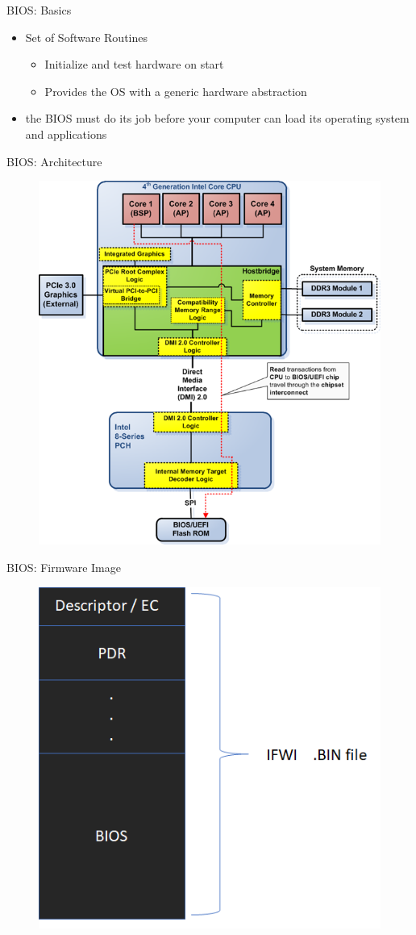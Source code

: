 \begin{frame}{BIOS: Basics}
    \begin{itemize}
        \item Set of Software Routines
            \begin{itemize}
                \item Initialize and test hardware on start
                \item Provides the OS with a generic hardware abstraction
            \end{itemize}
        \item the BIOS must do its job before your computer can load its operating system and applications
    \end{itemize}
\end{frame}

\begin{frame}{BIOS: Architecture}
    \begin{figure}
        \centering
        \includegraphics[width=0.6\linewidth]{Im/figures/bios-architecture.png}
        \label{fig:bios-architecture}
    \end{figure}
\end{frame}

\begin{frame}{BIOS: Firmware Image}
    \begin{figure}[htbp]
        \centering
        \includegraphics[width=0.6\linewidth]{Im/figures/design/integrated-firmware-image}
    \end{figure}
\end{frame}
